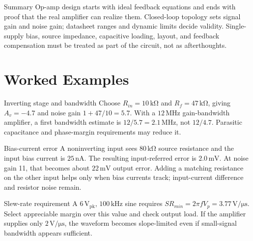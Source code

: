 \documentclass[10pt,letterpaper]{article}
\begin{document}
\begin{CornellNotesTable}
\end{CornellNotesTable}
\begin{CornellSummaryBox}{Summary}
Op-amp design starts with ideal feedback equations and ends with proof that the real amplifier can realize them. Closed-loop topology sets signal gain and noise gain; datasheet ranges and dynamic limits decide validity. Single-supply bias, source impedance, capacitive loading, layout, and feedback compensation must be treated as part of the circuit, not as afterthoughts.
\end{CornellSummaryBox}
\section{Worked Examples}
\begin{CornellExamBox}{Inverting stage and bandwidth}
Choose $R_{in}=10\,\mathrm{k\Omega}$ and $R_f=47\,\mathrm{k\Omega}$, giving $A_v=-4.7$ and noise gain $1+47/10=5.7$. With a $12\,\mathrm{MHz}$ gain-bandwidth amplifier, a first bandwidth estimate is $12/5.7=2.1\,\mathrm{MHz}$, not $12/4.7$. Parasitic capacitance and phase-margin requirements may reduce it.
\end{CornellExamBox}
\begin{CornellExamBox}{Bias-current error}
A noninverting input sees $80\,\mathrm{k\Omega}$ source resistance and the input bias current is $25\,\mathrm{nA}$. The resulting input-referred error is $2.0\,\mathrm{mV}$. At noise gain 11, that becomes about $22\,\mathrm{mV}$ output error. Adding a matching resistance on the other input helps only when bias currents track; input-current difference and resistor noise remain.
\end{CornellExamBox}
\begin{CornellExamBox}{Slew-rate requirement}
A $6\,\mathrm{V_{pk}}$, $100\,\mathrm{kHz}$ sine requires $SR_{min}=2\pi fV_p=3.77\,\mathrm{V/\mu s}$. Select appreciable margin over this value and check output load. If the amplifier supplies only $2\,\mathrm{V/\mu s}$, the waveform becomes slope-limited even if small-signal bandwidth appears sufficient.
\end{CornellExamBox}
\end{document}
